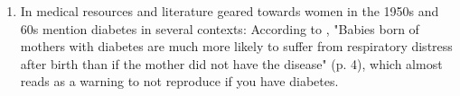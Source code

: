 \documentclass[12pt]{article}
\begin{document}
\begin{enumerate}
\item \citep{fishbein_1959_modern}
In medical resources and literature geared towards women in the 1950s and 60s mention diabetes in several contexts:
According to \citet{McKusick_1959_Health}, "Babies born of mothers with diabetes are much more likely to suffer from respiratory distress after birth than if the mother did not have the disease" (p. 4), which almost reads as a warning to not reproduce if you have diabetes. 

% 

\end{enumerate}
\end{document}
